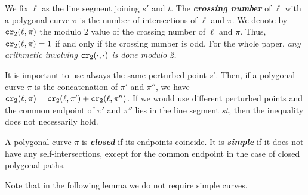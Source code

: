 \documentclass[a4paper,11pt]{article}
\newcommand\CR{\mbox{\tt cr}_2}
\def\DEF#1{\textbf{\emph{#1}}}
\begin{document}
We fix $\ell$ as the line segment joining $s'$ and $t$.
The \DEF{crossing number} of $\ell$ with a polygonal curve $\pi$
is the number of intersections of $\ell$ and $\pi$.
We denote by $\CR(\ell,\pi)$ the modulo $2$ value of the crossing number of $\ell$ and $\pi$.
Thus, $\CR(\ell,\pi)=1$ if and only if the crossing number is odd.
For the whole paper, \emph{any arithmetic involving $\CR(\cdot,\cdot)$ is done modulo 2.}

It is important to use always the same perturbed point $s'$. Then, if a polygonal curve $\pi$ is 
the concatenation of $\pi'$ and $\pi''$, we have
$\CR(\ell,\pi) = \CR(\ell,\pi') + \CR(\ell,\pi'')$. If we would use different perturbed points
and the common endpoint of $\pi'$ and $\pi''$ lies in the line segment $st$,
then the inequality does not necessarily hold.

A polygonal curve $\pi$ is \DEF{closed} if its endpoints coincide.
It is \DEF{simple} if it does not have any self-intersections, except for the common
endpoint in the case of closed polygonal paths. 

Note that in the following lemma we do not require simple curves.
\end{document}
